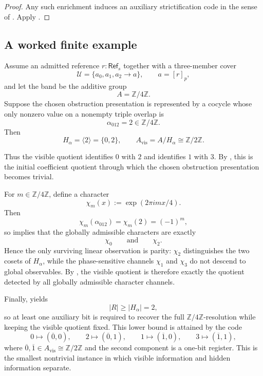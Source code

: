 \begin{proof}
Any such enrichment induces an auxiliary strictification code in the sense of . Apply .
\end{proof}

\subsection{A worked finite example}

\begin{example}\label{ex:one-bit-hidden-obstruction}
Assume an admitted reference $r:\mathsf{Ref}_s$ together with a three-member cover
\[
\mathcal U=\{a_0,a_1,a_2\to a\},
\qquad
a=[r]_p,
\]
and let the band be the additive group
\[
A=\mathbb Z/4\mathbb Z.
\]
Suppose the chosen obstruction presentation is represented by a cocycle whose only nonzero value on a nonempty triple overlap is
\[
\alpha_{012}=2\in \mathbb Z/4\mathbb Z.
\]
Then
\[
H_\alpha=\langle 2\rangle=\{0,2\},
\qquad
A_{\mathrm{vis}}=A/H_\alpha\cong \mathbb Z/2\mathbb Z.
\]

Thus the visible quotient identifies $0$ with $2$ and identifies $1$ with $3$. By , this is the initial coefficient quotient through which the chosen obstruction presentation becomes trivial.

For $m\in\mathbb Z/4\mathbb Z$, define a character
\[
\chi_m(x):=\exp(2\pi i mx/4).
\]
Then
\[
\chi_m(\alpha_{012})=\chi_m(2)=(-1)^m,
\]
so  implies that the globally admissible characters are exactly
\[
\chi_0
\qquad\text{and}\qquad
\chi_2.
\]
Hence the only surviving linear observation is parity: $\chi_2$ distinguishes the two cosets of $H_\alpha$, while the phase-sensitive channels $\chi_1$ and $\chi_3$ do not descend to global observables. By , the visible quotient is therefore exactly the quotient detected by all globally admissible character channels.

Finally,  yields
\[
|R|\ge |H_\alpha|=2,
\]
so at least one auxiliary bit is required to recover the full $\mathbb Z/4\mathbb Z$-resolution while keeping the visible quotient fixed. This lower bound is attained by the code
\[
0\mapsto (\overline{0},0),\qquad
2\mapsto (\overline{0},1),\qquad
1\mapsto (\overline{1},0),\qquad
3\mapsto (\overline{1},1),
\]
where $\overline{0},\overline{1}\in A_{\mathrm{vis}}\cong \mathbb Z/2\mathbb Z$ and the second component is a one-bit register. This is the smallest nontrivial instance in which visible information and hidden information separate.
\end{example}
